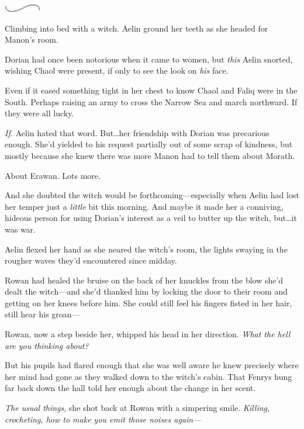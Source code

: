 \begin{center}
	\includegraphics[width=0.65in,height=0.13in]{images/seperator}
\end{center}

Climbing into bed with a witch.
Aelin ground her teeth as she headed for Manon's room.

Dorian had once been notorious when it came to women, but \emph{this}
 Aelin snorted, wishing Chaol were present, if only to see the look on \emph{his} face.

Even if it eased something tight in her chest to know Chaol and Faliq were in the South.
Perhaps raising an army to cross the Narrow Sea and march northward.
If they were all lucky.

\emph{If.} Aelin hated that word.
But\ldots her friendship with Dorian was precarious enough.
She'd yielded to his request partially out of some scrap of kindness, but mostly because she knew there was more Manon had to tell them about Morath.

About Erawan.
Lots more.

And she doubted the witch would be forthcoming---especially when Aelin had lost her temper just a \emph{little} bit this morning.
And maybe it made her a conniving, hideous person for using Dorian's interest as a veil to butter up the witch, but\ldots it was war.

Aelin flexed her hand as she neared the witch's room, the lights swaying in the rougher waves they'd encountered since midday.

Rowan had healed the bruise on the back of her knuckles from the blow she'd dealt the witch---and she'd thanked him by locking the door to their room and getting on her knees before him.
She could still feel his fingers fisted in her hair, still hear his groan---

Rowan, now a step beside her, whipped his head in her direction.
\emph{What the hell are you thinking about?}

But his pupils had flared enough that she was well aware he knew precisely where her mind had gone as they walked down to the witch's cabin.
That Fenrys hung far back down the hall told her enough about the change in her scent.

\emph{The usual things}, she shot back at Rowan with a simpering smile.
\emph{Killing, crocheting, how to make you emit those noises again---}

